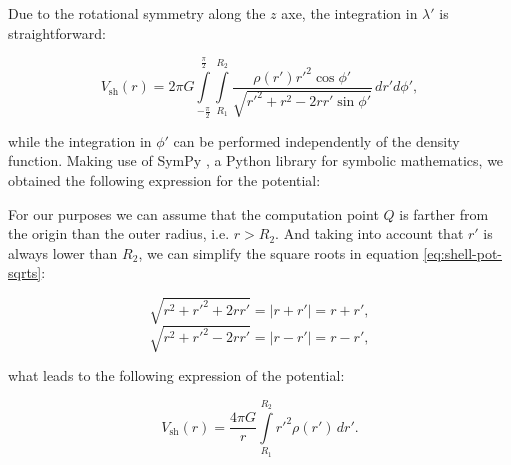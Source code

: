 \documentclass[extra]{gji}
\begin{document}
Due to the rotational symmetry along the $z$ axe, the integration in
$\lambda'$ is straightforward:

\begin{equation}
    V_\text{sh}(r) = 2\pi G
    \int\limits_{-\frac{\pi}{2}}^\frac{\pi}{2}
    \int\limits_{R_1}^{R_2}
    \frac{\rho(r') {r'}^2 \cos\phi'}{\sqrt{r'^2 + r^2 - 2 r r' \sin\phi'}}
    \, dr' d\phi',
\end{equation}

\noindent while the integration in $\phi'$ can be performed
independently of the density function.
Making use of SymPy \citep{sympy2017}, a Python library for symbolic
mathematics, we obtained the following expression for the potential:


For our purposes we can assume that the computation point $Q$ is
farther from the origin than the outer radius, i.e. $r>R_2$.
And taking into account that $r'$ is always lower than $R_2$, we can
simplify the square roots in equation \ref{eq:shell-pot-sqrts}:

\begin{equation}
    \sqrt{r^2 + r'^2 + 2rr'} = |r + r'| = r + r',
\end{equation}
\begin{equation}
    \sqrt{r^2 + r'^2 - 2rr'} = |r - r'| = r - r',
\end{equation}

\noindent what leads to the following expression of the potential:

\begin{equation}
    V_\text{sh}(r) = \frac{4\pi G}{r}
    \int\limits_{R_1}^{R_2} {r'}^2 \rho(r') \, dr'.
\label{eq:shell-pot}
\end{equation}
\end{document}
